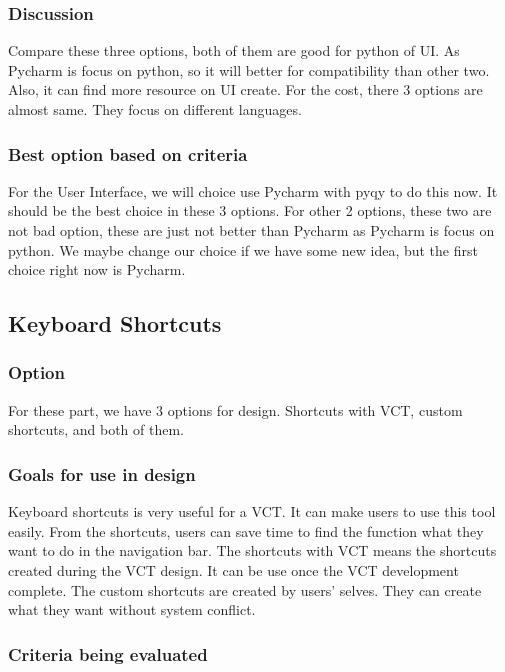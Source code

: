\documentclass [10pt]{article}
\begin{document}
\subsubsection{Discussion}
Compare these three options, both of them are good for python of UI. As Pycharm is focus on python, so it will better for compatibility than other two. Also, it can find more resource on UI create. For the cost, there 3 options are almost same. They focus on different languages. 

\subsubsection{Best option based on criteria}
For the User Interface, we will choice use Pycharm with pyqy to do this now. It should be the best choice in these 3 options. For other 2 options, these two are not bad option, these are just not better than Pycharm as Pycharm is focus on python. We maybe change our choice if we have some new idea, but the first choice right now is Pycharm.

\subsection{Keyboard Shortcuts}

\subsubsection{Option}
For these part, we have 3 options for design. Shortcuts with VCT, custom shortcuts, and both of them. 

\subsubsection{Goals for use in design}
Keyboard shortcuts is very useful for a VCT. It can make users to use this tool easily. From the shortcuts, users can save time to find the function what they want to do in the navigation bar. The shortcuts with VCT means the shortcuts created during the VCT design. It can be use once the VCT development complete. The custom shortcuts are created by users’ selves. They can create what they want without system conflict. 

\subsubsection{Criteria being evaluated}
\end{document}
